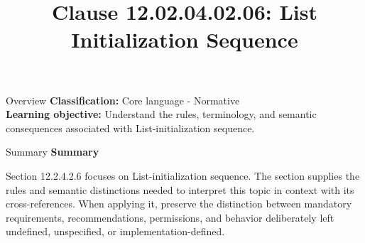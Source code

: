 \documentclass[10pt,letterpaper]{article}
\title{Clause 12.02.04.02.06: List Initialization Sequence}
\author{}
\date{}
\begin{document}
\maketitle
\begin{CornellOverviewBox}{Overview}
\textbf{Classification:} Core language - Normative\\[2pt]
\textbf{Learning objective:} Understand the rules, terminology, and semantic consequences associated with List-initialization sequence.
\end{CornellOverviewBox}\begin{CornellSummaryBox}{Summary}
{\sffamily\bfseries\color{Accent} Summary}\par\vspace{3pt}Section 12.2.4.2.6 focuses on List-initialization sequence. The section supplies the rules and semantic distinctions needed to interpret this topic in context with its cross-references. When applying it, preserve the distinction between mandatory requirements, recommendations, permissions, and behavior deliberately left undefined, unspecified, or implementation-defined.
\end{CornellSummaryBox}
\end{document}
